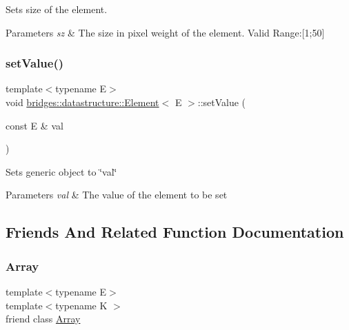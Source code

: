 Sets size of the element. 


\begin{DoxyParams}{Parameters}
{\em sz} & The size in pixel weight of the element. Valid Range\+:\mbox{[}1;50\mbox{]} \\
\hline
\end{DoxyParams}
\mbox{\label{classbridges_1_1datastructure_1_1_element_a26f2aceb9eed7195fd55b3538f3c059f}} 
\subsubsection{\texorpdfstring{setValue()}{setValue()}}
{\footnotesize\ttfamily template$<$typename E$>$ \\
void \mbox{\hyperlink{classbridges_1_1datastructure_1_1_element}{bridges\+::datastructure\+::\+Element}}$<$ E $>$\+::set\+Value (\begin{DoxyParamCaption}\item[{const E \&}]{val }\end{DoxyParamCaption})\hspace{0.3cm}{\ttfamily [inline]}}

Sets generic object to \char`\"{}val\char`\"{}


\begin{DoxyParams}{Parameters}
{\em val} & The value of the element to be set \\
\hline
\end{DoxyParams}


\subsection{Friends And Related Function Documentation}
\mbox{\label{classbridges_1_1datastructure_1_1_element_ab1a595168ea1870ce436dfd2d8e69b6d}} 
\subsubsection{\texorpdfstring{Array}{Array}}
{\footnotesize\ttfamily template$<$typename E$>$ \\
template$<$typename K $>$ \\
friend class \mbox{\hyperlink{classbridges_1_1datastructure_1_1_array}{Array}}\hspace{0.3cm}{\ttfamily [friend]}}

